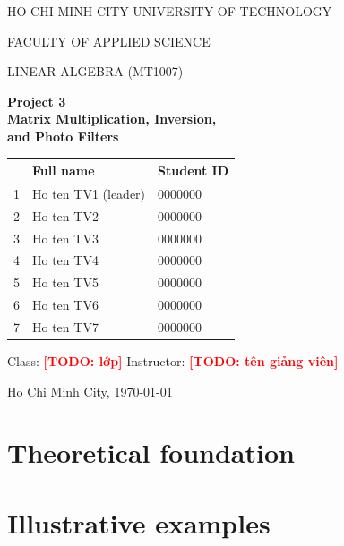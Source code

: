 \documentclass[11pt,a4paper]{article}
\newcommand{\todo}[1]{\textcolor{red}{\textbf{[TODO: #1]}}}
\begin{document}
\begin{titlepage}
\centering
{\large HO CHI MINH CITY UNIVERSITY OF TECHNOLOGY\par}
{\large FACULTY OF APPLIED SCIENCE\par}   %
\vspace{2.5cm}
{\Large LINEAR ALGEBRA (MT1007)\par}
\vspace{0.8cm}
{\LARGE\bfseries Project 3\\[4pt] Matrix Multiplication, Inversion,\\ and Photo Filters\par}
\vspace{2cm}
\begin{tabular}{lll}
\toprule
 & Full name & Student ID \\
\midrule
1 & Ho ten TV1 (leader) & 0000000 \\
2 & Ho ten TV2 & 0000000 \\
3 & Ho ten TV3 & 0000000 \\
4 & Ho ten TV4 & 0000000 \\
5 & Ho ten TV5 & 0000000 \\
6 & Ho ten TV6 & 0000000 \\
7 & Ho ten TV7 & 0000000 \\
\bottomrule
\end{tabular}

\vspace{1.2cm}
Class: \todo{lớp} \qquad Instructor: \todo{tên giảng viên}
\vfill
{Ho Chi Minh City, \today\par}
\end{titlepage}

\tableofcontents
\newpage

\section{Theoretical foundation}\label{sec:theory}
\section{Illustrative examples}\label{sec:examples}
\end{document}
